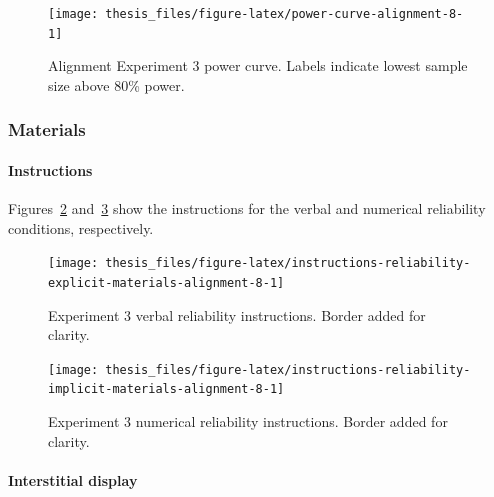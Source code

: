 \documentclass[a4paper, nobind, dvipsnames]{templates/ociamthesis}
\theoremstyle{definition}
\theoremstyle{definition}
\theoremstyle{definition}
\theoremstyle{definition}
\theoremstyle{remark}
\begin{document}
\newpage

\begin{landscape}



\begin{figure}
\texttt{[image: thesis\_files/figure-latex/power-curve-alignment-8-1]} \caption{Alignment Experiment 3 power curve. Labels indicate lowest sample size above 80\% power.}\label{fig:power-curve-alignment-8}
\end{figure}

\end{landscape}

\newpage

\hypertarget{materials-11}{%
\subsubsection{Materials}\label{materials-11}}

\hypertarget{instructions-materials-alignment-8-appendix}{%
\paragraph{Instructions}\label{instructions-materials-alignment-8-appendix}}

Figures~\ref{fig:instructions-reliability-explicit-materials-alignment-8}
and~\ref{fig:instructions-reliability-implicit-materials-alignment-8} show the
instructions for the verbal and numerical reliability conditions, respectively.



\begin{figure}
\texttt{[image: thesis\_files/figure-latex/instructions-reliability-explicit-materials-alignment-8-1]} \caption{Experiment 3 verbal reliability instructions. Border added for clarity.}\label{fig:instructions-reliability-explicit-materials-alignment-8}
\end{figure}



\begin{figure}
\texttt{[image: thesis\_files/figure-latex/instructions-reliability-implicit-materials-alignment-8-1]} \caption{Experiment 3 numerical reliability instructions. Border added for clarity.}\label{fig:instructions-reliability-implicit-materials-alignment-8}
\end{figure}

\hypertarget{interstitial-materials-alignment-8}{%
\paragraph{Interstitial display}\label{interstitial-materials-alignment-8}}
\end{document}
